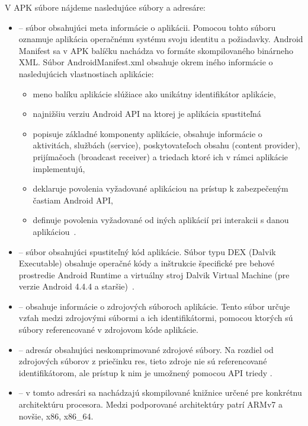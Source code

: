 V APK súbore nájdeme nasledujúce súbory a adresáre:
\begin{itemize}

	\item {} -- súbor obsahujúci meta informácie o aplikácii. Pomocou tohto súboru oznamuje aplikácia operačnému systému svoju identitu a požiadavky. Android Manifest sa v APK balíčku nachádza vo formáte skompilovaného binárneho XML.
Súbor AndroidManifest.xml obsahuje okrem iného informácie o nasledujúcich vlastnostiach aplikácie:
		
		\begin{itemize}
			\item meno balíku aplikácie slúžiace ako unikátny identifikátor aplikácie,
			\item najnižšiu verziu Android API na ktorej je aplikácia spustiteľná
			\item popisuje základné komponenty aplikácie, obsahuje informácie o aktivitách, službách (service), poskytovateľoch obsahu (content provider), prijímačoch (broadcast receiver) a triedach ktoré ich v rámci aplikácie implementujú,
			\item deklaruje povolenia vyžadované aplikáciou na prístup k zabezpečeným častiam Android API,
			\item definuje povolenia vyžadované od iných aplikácií pri interakcii s danou aplikáciou~\cite{Manifest}.
		\end{itemize}
	
	\item {} -- súbor obsahujúci spustiteľný kód aplikácie. Súbor typu DEX (Dalvik Executable) obsahuje operačné kódy a inštrukcie špecifické pre behové prostredie Android Runtime a virtuálny stroj Dalvik Virtual Machine (pre verzie Android 4.4.4 a staršie)~\cite{DexFormat}. 

	\item {} -- obsahuje informácie o zdrojových súboroch aplikácie. Tento súbor určuje vzťah medzi zdrojovými súbormi a ich identifikátormi, pomocou ktorých sú súbory referencované v zdrojovom kóde aplikácie.
	
	\item {} -- adresár obsahujúci neskomprimované zdrojové súbory.  Na rozdiel od zdrojových súborov z priečinku res, tieto zdroje nie sú referencované identifikátorom, ale prístup k nim je umožnený pomocou API triedy .
	
	\item {} -- v tomto adresári sa nachádzajú skompilované knižnice určené pre konkrétnu architektúru procesora. Medzi podporované architektúry patrí ARMv7 a novšie, x86, x86\_64.


\end{itemize}

